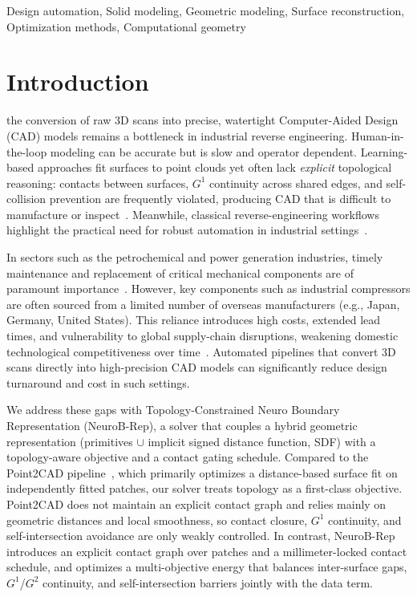 \documentclass{ieeeaccess}
\begin{document}
\begin{keywords}
Design automation, Solid modeling, Geometric modeling, Surface reconstruction, Optimization methods, Computational geometry
\end{keywords}


\titlepgskip=-15pt
\maketitle

\section{Introduction}
\label{sec:introduction}
 the conversion of raw 3D scans into precise, watertight Computer-Aided Design (CAD) models remains a bottleneck in industrial reverse engineering. Human-in-the-loop modeling can be accurate but is slow and operator dependent. Learning-based approaches fit surfaces to point clouds yet often lack \emph{explicit} topological reasoning: contacts between surfaces, $G^1$ continuity across shared edges, and self-collision prevention are frequently violated, producing CAD that is difficult to manufacture or inspect~\cite{b2,b3,b4,b20,b1,b9,b24}. Meanwhile, classical reverse-engineering workflows highlight the practical need for robust automation in industrial settings~\cite{b16,b25}.

In sectors such as the petrochemical and power generation industries, timely maintenance and replacement of critical mechanical components are of paramount importance~\cite{b16,b25}. However, key components such as industrial compressors are often sourced from a limited number of overseas manufacturers (e.g., Japan, Germany, United States). This reliance introduces high costs, extended lead times, and vulnerability to global supply-chain disruptions, weakening domestic technological competitiveness over time~\cite{b16}. Automated pipelines that convert 3D scans directly into high-precision CAD models can significantly reduce design turnaround and cost in such settings.

We address these gaps with Topology-Constrained Neuro Boundary Representation (NeuroB-Rep), a solver that couples a hybrid geometric representation (primitives $\cup$ implicit signed distance function, SDF) with a topology-aware objective and a contact gating schedule.
Compared to the Point2CAD pipeline~\cite{b2}, which primarily optimizes a distance-based surface fit on independently fitted patches, our solver treats topology as a first-class objective. Point2CAD does not maintain an explicit contact graph and relies mainly on geometric distances and local smoothness, so contact closure, $G^1$ continuity, and self-intersection avoidance are only weakly controlled. In contrast, NeuroB-Rep introduces an explicit contact graph over patches and a millimeter-locked contact schedule, and optimizes a multi-objective energy that balances inter-surface gaps, $G^1$/$G^2$ continuity, and self-intersection barriers jointly with the data term.
\end{document}
